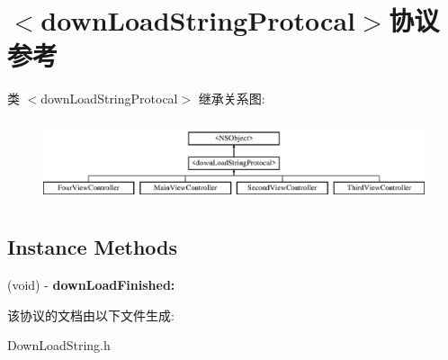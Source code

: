 \hypertarget{protocoldown_load_string_protocal-p}{\section{$<$down\-Load\-String\-Protocal$>$协议 参考}
\label{protocoldown_load_string_protocal-p}
}
类 $<$down\-Load\-String\-Protocal$>$ 继承关系图\-:\begin{figure}[H]
\begin{center}
\leavevmode
\includegraphics[height=2.441860cm]{protocoldown_load_string_protocal-p}
\end{center}
\end{figure}
\subsection*{Instance Methods}
\begin{DoxyCompactItemize}
\item 
\hypertarget{protocoldown_load_string_protocal-p_a4ce73ee56600cc02c8a245cc21286277}{(void) -\/ {\bfseries down\-Load\-Finished\-:}}\label{protocoldown_load_string_protocal-p_a4ce73ee56600cc02c8a245cc21286277}

\end{DoxyCompactItemize}


该协议的文档由以下文件生成\-:\begin{DoxyCompactItemize}
\item 
Down\-Load\-String.\-h\end{DoxyCompactItemize}
